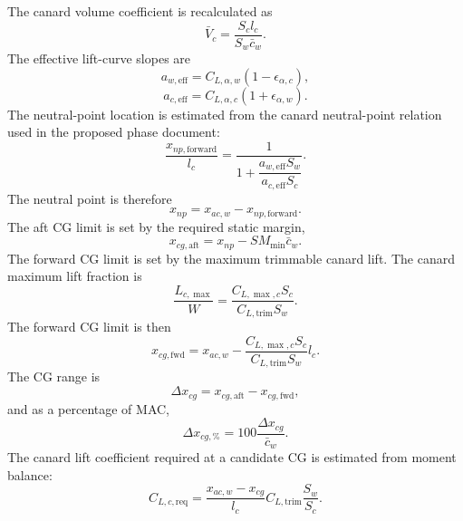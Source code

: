 The canard volume coefficient is recalculated as
\begin{equation}
    \bar{V}_c =
    \frac{S_c l_c}{S_w\bar{c}_w}.
    \label{eq:ppa_phase10_vbar}
\end{equation}
The effective lift-curve slopes are
\begin{equation}
    a_{w,\mathrm{eff}} = C_{L,\alpha,w}(1-\epsilon_{\alpha,c}),
    \label{eq:ppa_aw_eff}
\end{equation}
\begin{equation}
    a_{c,\mathrm{eff}} = C_{L,\alpha,c}(1+\epsilon_{\alpha,w}).
    \label{eq:ppa_ac_eff}
\end{equation}
The neutral-point location is estimated from the canard neutral-point relation used in the proposed phase document:
\begin{equation}
    \frac{x_{np,\mathrm{forward}}}{l_c}
    =
    \frac{1}
    {1+
    \dfrac{a_{w,\mathrm{eff}}S_w}{a_{c,\mathrm{eff}}S_c}} .
    \label{eq:ppa_canard_np_fraction}
\end{equation}
The neutral point is therefore
\begin{equation}
    x_{np} =
    x_{ac,w}
    -
    x_{np,\mathrm{forward}}.
    \label{eq:ppa_np_location}
\end{equation}
The aft CG limit is set by the required static margin,
\begin{equation}
    x_{cg,\mathrm{aft}} =
    x_{np}-SM_{\min}\bar{c}_w.
    \label{eq:ppa_aft_cg}
\end{equation}
The forward CG limit is set by the maximum trimmable canard lift. The canard maximum lift fraction is
\begin{equation}
    \frac{L_{c,\max}}{W}
    =
    \frac{C_{L,\max,c}S_c}{C_{L,\mathrm{trim}}S_w}.
    \label{eq:ppa_canard_lift_fraction}
\end{equation}
The forward CG limit is then
\begin{equation}
    x_{cg,\mathrm{fwd}} =
    x_{ac,w}
    -
    \frac{C_{L,\max,c}S_c}{C_{L,\mathrm{trim}}S_w}l_c .
    \label{eq:ppa_forward_cg}
\end{equation}
The CG range is
\begin{equation}
    \Delta x_{cg}
    =
    x_{cg,\mathrm{aft}}-x_{cg,\mathrm{fwd}},
    \label{eq:ppa_cg_range}
\end{equation}
and as a percentage of MAC,
\begin{equation}
    \Delta x_{cg,\%}
    =
    100\frac{\Delta x_{cg}}{\bar{c}_w}.
    \label{eq:ppa_cg_percent}
\end{equation}
The canard lift coefficient required at a candidate CG is estimated from moment balance:
\begin{equation}
    C_{L,c,\mathrm{req}} =
    \frac{x_{ac,w}-x_{cg}}{l_c}
    C_{L,\mathrm{trim}}
    \frac{S_w}{S_c}.
    \label{eq:ppa_canard_required_cl}
\end{equation}

